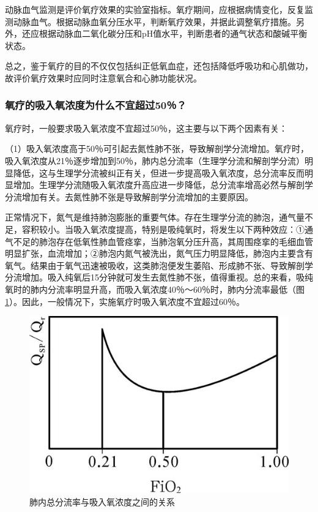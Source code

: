 动脉血气监测是评价氧疗效果的实验室指标。氧疗期间，应根据病情变化，反复监测动脉血气。根据动脉血氧分压水平，判断氧疗效果，并据此调整氧疗措施。另外，还应根据动脉血二氧化碳分压和pH值水平，判断患者的通气状态和酸碱平衡状态。

总之，鉴于氧疗的目的不仅仅包括纠正低氧血症，还包括降低呼吸功和心肌做功，故评价氧疗效果时应同时注意氧合和心肺功能状况。

\subsubsection{氧疗的吸入氧浓度为什么不宜超过50％？}

氧疗时，一般要求吸入氧浓度不宜超过50％，这主要与以下两个因素有关：

（1）吸入氧浓度高于50％可引起去氮性肺不张，导致解剖学分流增加。氧疗时，吸入氧浓度从21％逐步增加到50％，肺内总分流率（生理学分流和解剖学分流）明显降低，这与生理学分流被纠正有关，但进一步提高吸入氧浓度，总分流率反而明显增加。生理学分流随吸入氧浓度升高应进一步降低，总分流率增高必然与解剖学分流增加有关。去氮性肺不张是导致解剖学分流增加的主要原因。

正常情况下，氮气是维持肺泡膨胀的重要气体。存在生理学分流的肺泡，通气量不足，容积较小。当吸入氧浓度提高，特别是吸纯氧时，将发生以下两种效应：①通气不足的肺泡存在低氧性肺血管痉挛，当肺泡氧分压升高，其周围痉挛的毛细血管明显扩张，血流增加；②肺泡内氮气被洗出，氮气压力明显降低，肺泡内主要含有氧气。结果由于氧气迅速被吸收，这类肺泡便发生萎陷、形成肺不张、导致解剖学分流增加。吸入纯氧后15分钟就可发生去氮性肺不张，值得重视。总的来看，吸纯氧时的肺内分流率明显升高，而吸入氧浓度40％～60％时，肺内分流率最低（图\ref{fig9-5}）。因此，一般情况下，实施氧疗时吸入氧浓度不宜超过60％。

\begin{figure}[!htbp]
 \centering
 \includegraphics{./images/Image00075.jpg}
 \captionsetup{justification=centering}
 \caption{肺内总分流率与吸入氧浓度之间的关系}
 \label{fig9-5}
  \end{figure} 

